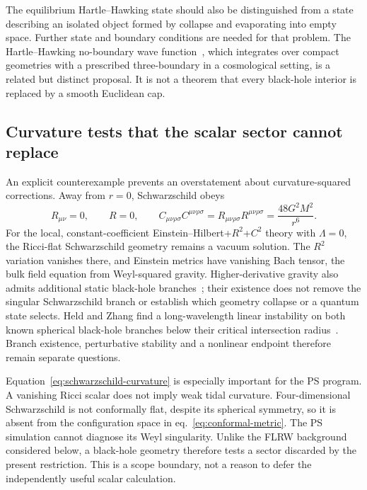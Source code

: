 The equilibrium Hartle--Hawking state should also be distinguished from a state describing an isolated object formed by collapse and evaporating into empty space.  Further state and boundary conditions are needed for that problem.  The Hartle--Hawking no-boundary wave function~\cite{HartleHawking:1983}, which integrates over compact geometries with a prescribed three-boundary in a cosmological setting, is a related but distinct proposal.  It is not a theorem that every black-hole interior is replaced by a smooth Euclidean cap.

\subsection{Curvature tests that the scalar sector cannot replace}
\label{sec:black-hole-curvature}

An explicit counterexample prevents an overstatement about curvature-squared corrections.  Away from $r=0$, Schwarzschild obeys
\begin{equation}
 R_{\mu\nu}=0,\qquad R=0,\qquad
 C_{\mu\nu\rho\sigma}C^{\mu\nu\rho\sigma}
 =R_{\mu\nu\rho\sigma}R^{\mu\nu\rho\sigma}
 =\frac{48G^2M^2}{r^6}.
 \label{eq:schwarzschild-curvature}
\end{equation}
For the local, constant-coefficient Einstein--Hilbert+$R^2$+$C^2$ theory with $\Lambda=0$, the Ricci-flat Schwarzschild geometry remains a vacuum solution.  The $R^2$ variation vanishes there, and Einstein metrics have vanishing Bach tensor, the bulk field equation from Weyl-squared gravity.  Higher-derivative gravity also admits additional static black-hole branches~\cite{Lu:2015}; their existence does not remove the singular Schwarzschild branch or establish which geometry collapse or a quantum state selects.  Held and Zhang find a long-wavelength linear instability on both known spherical black-hole branches below their critical intersection radius~\cite{HeldZhang:2023}.  Branch existence, perturbative stability and a nonlinear endpoint therefore remain separate questions.

Equation~\eqref{eq:schwarzschild-curvature} is especially important for the PS program.  A vanishing Ricci scalar does not imply weak tidal curvature.  Four-dimensional Schwarzschild is not conformally flat, despite its spherical symmetry, so it is absent from the configuration space in eq.~\eqref{eq:conformal-metric}.  The PS simulation cannot diagnose its Weyl singularity.  Unlike the FLRW background considered below, a black-hole geometry therefore tests a sector discarded by the present restriction.  This is a scope boundary, not a reason to defer the independently useful scalar calculation.


